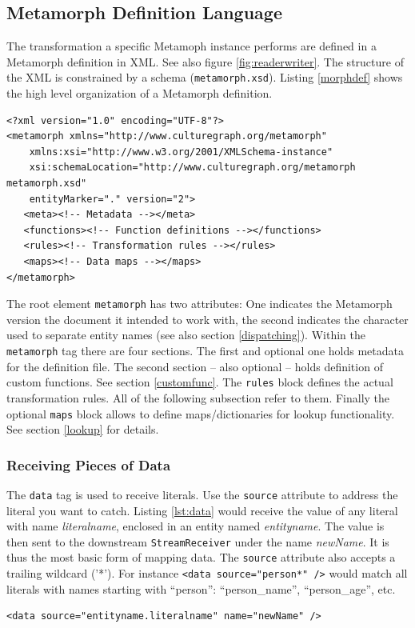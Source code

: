 \documentclass[12pt,a4paper]{article}
\begin{document}
\subsection{Metamorph Definition Language}\label{def_lang}
The transformation a specific Metamoph instance performs are defined in a Metamorph definition in XML. See also figure \ref{fig:readerwriter}. The structure of the XML is constrained by a schema ({\tt metamorph.xsd}). Listing \ref{morphdef} shows the high level organization of a Metamorph definition.

\begin{lstlisting}[float=htb, label=morphdef,caption=Structure of a Metamorph definition file.]
<?xml version="1.0" encoding="UTF-8"?>
<metamorph xmlns="http://www.culturegraph.org/metamorph"
	xmlns:xsi="http://www.w3.org/2001/XMLSchema-instance"
	xsi:schemaLocation="http://www.culturegraph.org/metamorph metamorph.xsd"
	entityMarker="." version="2">
   <meta><!-- Metadata --></meta>
   <functions><!-- Function definitions --></functions>
   <rules><!-- Transformation rules --></rules>
   <maps><!-- Data maps --></maps>
</metamorph>
\end{lstlisting}
The root element {\tt metamorph} has two attributes: One indicates the Metamorph version the document it intended to work with, the second indicates the character used to separate entity names (see also section \ref{dispatching}). Within the {\tt metamorph} tag there are four sections.
The first and optional one holds metadata for the definition file. The second section -- also optional -- holds definition of custom functions. See section \ref{customfunc}.
The {\tt rules} block defines the actual transformation rules. All of the following subsection refer to them.
Finally the optional {\tt maps} block allows to define maps/dictionaries for lookup functionality. See section \ref{lookup} for details.


\subsubsection{Receiving Pieces of Data}\label{data}

The {\tt data} tag is used to receive literals. Use the {\tt source} attribute to address the literal you want to catch. Listing \ref{lst:data} would receive the value of any literal with name {\it literalname}, enclosed in an entity named {\it entityname}.
The value is then sent to the downstream {\tt StreamReceiver} under the name {\it newName}. It is thus the most basic form of mapping data. The {\tt source} attribute also accepts a trailing wildcard ('*'). For instance {\tt <data source="person*" />} would match all literals with names starting with ``person'': ``person\_name'', ``person\_age'', etc.
\begin{lstlisting}[float=htb, label=lst:data,caption=Receiving values from literals]
<data source="entityname.literalname" name="newName" />
\end{lstlisting}
\end{document}
